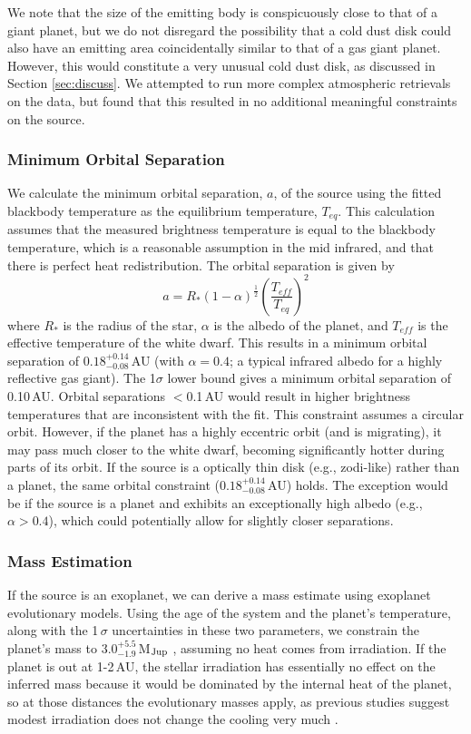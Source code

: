 \documentclass[twocolumn]{aastex631}
\begin{document}
We note that the size of the emitting body is conspicuously close to that of a giant planet, but we do not disregard the possibility that a cold dust disk could also have an emitting area coincidentally similar to that of a gas giant planet. However, this would constitute a very unusual cold dust disk, as discussed in Section \ref{sec:discuss}.
We attempted to run more complex atmospheric retrievals on the data, but found that this resulted in no additional meaningful constraints on the source. 

\subsubsection{Minimum Orbital Separation}

We calculate the minimum orbital separation, $a$, of the source using the fitted blackbody temperature as the equilibrium temperature, $T_{eq}$. This calculation assumes that the measured brightness temperature is equal to the blackbody temperature, which is a reasonable assumption in the mid infrared, and that there is perfect heat redistribution. The orbital separation is given by
\begin{equation}
 a = R_*(1-\alpha)^\frac{1}{2}\left(\frac{T_{eff}}{T_{eq}}\right)^2
\end{equation}
where $R_*$ is the radius of the star, $\alpha$ is the albedo of the planet, and $T_{eff}$ is the effective temperature of the white dwarf. This results in a minimum orbital separation of $0.18^{+0.14}_{-0.08}$\,AU (with $\alpha = 0.4$; a typical infrared albedo for a highly reflective gas giant). The 1$\sigma$ lower bound gives a minimum orbital separation of 0.10\,AU.  Orbital separations $<$0.1\,AU would result in higher brightness temperatures that are inconsistent with the fit. This constraint assumes a circular orbit. However, if the planet has a highly eccentric orbit (and is migrating), it may pass much closer to the white dwarf, becoming significantly hotter during parts of its orbit.
If the source is a optically thin disk (e.g., zodi-like) rather than a planet, the same orbital constraint ($0.18^{+0.14}_{-0.08}$\,AU) holds. The exception would be if the source is a planet and exhibits an exceptionally high albedo (e.g., $\alpha > 0.4$), which could potentially allow for slightly closer separations.  


\subsubsection{Mass Estimation}\label{sec:mass}
If the source is an exoplanet, we can derive a mass estimate using exoplanet evolutionary models. 
Using the age of the system and the planet's temperature, along with the 1\,$\sigma$ uncertainties in these two parameters, we constrain the planet's mass to $3.0^{+5.5}_{-1.9}$\,M$_{\rm Jup}$ \citep{Marley2021}, assuming no heat comes from irradiation.
If the planet is out at 1-2\,AU, the stellar irradiation has essentially no effect on the inferred mass because it would be dominated by the internal heat of the planet, so at those distances the evolutionary masses apply, as previous studies suggest modest irradiation does not change the cooling very much \citep{2007ApJ...659.1661F}.
\end{document}
